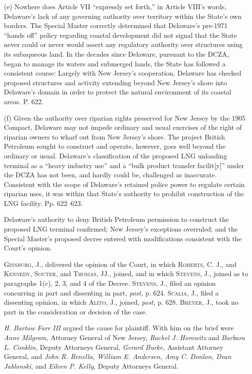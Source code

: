   (e) Nowhere does Article VII ``expressly set forth,'' in Article
VIII's words, Delaware's lack of any governing authority over
territory within the State's own borders. The Special Master correctly
determined that Delaware's pre-1971 ``hands off'' policy regarding
coastal development did not signal that the State never could or
never would assert any regulatory authority over structures using
its subaqueous land. In the decades since Delaware, pursuant to the
DCZA, began to manage its waters and submerged lands, the State has
followed a consistent course: Largely with New Jersey's cooperation,
Delaware has checked proposed structures and activity extending beyond
New Jersey's shore into Delaware's domain in order to protect the
natural environment of its coastal areas. P. 622.

  (f) Given the authority over riparian rights preserved for New
Jersey by the 1905 Compact, Delaware may not impede ordinary and
usual exercises of the right of riparian owners to wharf out from New
Jersey's shore. The project British Petroleum sought to construct
and operate, \newpage  however, goes well beyond the ordinary or usual.
Delaware's classification of the proposed LNG unloading terminal as a
``heavy industry use'' and a ``bulk product transfer facilit[y]''
under the DCZA has not been, and hardly could be, challenged as
inaccurate. Consistent with the scope of Delaware's retained
police power to regulate certain riparian uses, it was within that
State's authority to prohibit construction of the LNG facility. Pp.
622--623.

\noindent Delaware's authority to deny British Petroleum permission to construct
the proposed LNG terminal confirmed; New Jersey's exceptions
overruled; and the Special Master's proposed decree entered with
modifications consistent with the Court's opinion.

  \textsc{Ginsburg,} J., delivered the opinion of the Court, in which
\textsc{Roberts,} C. J., and \textsc{Kennedy, Souter,} and \textsc{Thomas,} JJ.,
joined, and in which \textsc{Stevens,} J., joined as to paragraphs 1(c), 2,
3, and 4 of the Decree. \textsc{Stevens,} \textsc{J.,} filed an opinion concurring
in part and dissenting in part, \emph{post,} p. 624. \textsc{Scalia,} J.,
filed a dissenting opinion, in which \textsc{Alito,} J., joined, \emph{post,}
p. 628. \textsc{Breyer,} J., took no part in the consideration or decision
of the case.

  \emph{H. Bartow Farr III} argued the cause for plaintiff. With him on the
brief were \emph{Anne Milgram,} Attorney General of New Jersey, \emph{Rachel
J. Horowitz} and \emph{Barbara L. Conklin,} Deputy Attorneys General,
\emph{Gerard Burke,} Assistant Attorney General, and \emph{John R. Renella,
William E. Andersen, Amy C. Donlon, Dean Jablonski,} and \emph{Eileen P.
Kelly,} Deputy Attorneys General.

